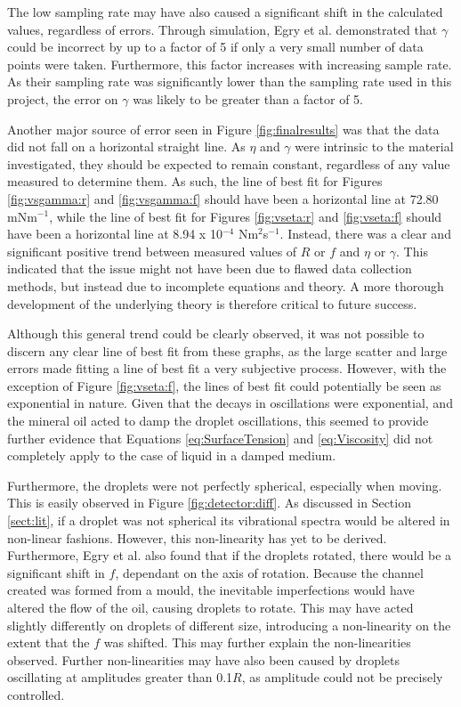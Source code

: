 \documentclass{physics_article_B}
\begin{document}
        \vspace*{-0.4cm}
        The low sampling rate may have also caused a significant shift in the calculated values, regardless of errors. Through simulation, Egry et al.\cite{egry} demonstrated that $\gamma$ could be incorrect by up to a factor of 5 if only a very small number of data points were taken. Furthermore, this factor increases with increasing sample rate. As their sampling rate was significantly lower than the sampling rate used in this project, the error on $\gamma$ was likely to be greater than a factor of 5.
        
        Another major source of error seen in Figure \ref{fig:finalresults} was that the data did not fall on a horizontal straight line. As $\eta$ and $\gamma$ were intrinsic to the material investigated, they should be expected to remain constant, regardless of any value measured to determine them. As such, the line of best fit for Figures \ref{fig:vsgamma:r} and \ref{fig:vsgamma:f} should have been a horizontal line at 72.80 mNm$^{-1}$, while the line of best fit for Figures \ref{fig:vseta:r} and \ref{fig:vseta:f} should have been a horizontal line at 8.94 x 10$^{-4}$ Nm$^{2}$s$^{-1}$. Instead, there was a clear and significant positive trend between measured values of $R$ or $f$ and $\eta$ or $\gamma$. This indicated that the issue might not have been due to flawed data collection methods, but instead due to incomplete equations and theory. A more thorough development of the underlying theory is therefore critical to future success.
        
        Although this general trend could be clearly observed, it was not possible to discern any clear line of best fit from these graphs, as the large scatter and large errors made fitting a line of best fit a very subjective process. However, with the exception of Figure \ref{fig:vseta:f}, the lines of best fit could potentially be seen as exponential in nature. Given that the decays in oscillations were exponential, and the mineral oil acted to damp the droplet oscillations, this seemed to provide further evidence that Equations \ref{eq:SurfaceTension} and \ref{eq:Viscosity} did not completely apply to the case of liquid in a damped medium.
        
        \newpage Furthermore, the droplets were not perfectly spherical, especially when moving. This is easily observed in Figure \ref{fig:detector:diff}. As discussed in Section \ref{sect:lit}, if a droplet was not spherical its vibrational spectra would be altered in non-linear fashions. However, this non-linearity has yet to be derived\cite{harrold2}. Furthermore, Egry et al.\cite{egry} also found that if the droplets rotated, there would be a significant shift in $f$, dependant on the axis of rotation. Because the channel created was formed from a mould, the inevitable imperfections would have altered the flow of the oil, causing droplets to rotate. This may have acted slightly differently on droplets of different size, introducing a non-linearity on the extent that the $f$ was shifted. This may further explain the non-linearities observed. Further non-linearities may have also been caused by droplets oscillating at amplitudes greater than 0.1$R$, as amplitude could not be precisely controlled.
        
\end{document}

